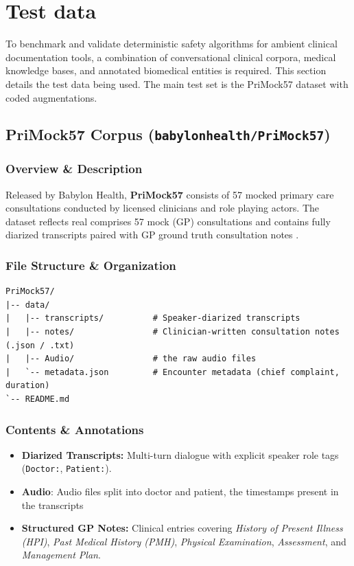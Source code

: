 \documentclass[11pt,a4paper]{article}
\begin{document}
\section{Test data}
\label{sec:Test data}

To benchmark and validate deterministic safety algorithms for ambient clinical documentation tools, a combination of conversational clinical corpora, medical knowledge bases, and annotated biomedical entities is required. This section details the test data being used. The main test set is the PriMock57 dataset with coded augmentations.

\subsection{PriMock57 Corpus (\texttt{babylonhealth/PriMock57})}
\label{subsec:PriMock57}


\subsubsection*{Overview \& Description}
Released by Babylon Health, \textbf{PriMock57} consists of 57 mocked primary care consultations conducted by licensed clinicians and role playing actors. The dataset reflects real comprises 57 mock (GP) consultations and contains fully diarized transcripts paired with GP ground truth consultation notes \cite{korfiatis2022primock57} .

\subsubsection*{File Structure \& Organization}
\begin{verbatim}
PriMock57/
|-- data/
|   |-- transcripts/          # Speaker-diarized transcripts
|   |-- notes/                # Clinician-written consultation notes (.json / .txt)
|   |-- Audio/                # the raw audio files
|   `-- metadata.json         # Encounter metadata (chief complaint, duration)
`-- README.md
\end{verbatim}

\subsubsection*{Contents \& Annotations}
\begin{itemize}
    \item \textbf{Diarized Transcripts:} Multi-turn dialogue with explicit speaker role tags (\texttt{Doctor:}, \texttt{Patient:}).
    \item \textbf{Audio}: Audio files split into doctor and patient, the timestamps present in the transcripts
    \item \textbf{Structured GP Notes:} Clinical entries covering \textit{History of Present Illness (HPI)}, \textit{Past Medical History (PMH)}, \textit{Physical Examination}, \textit{Assessment}, and \textit{Management Plan}.
\end{itemize}
\end{document}
